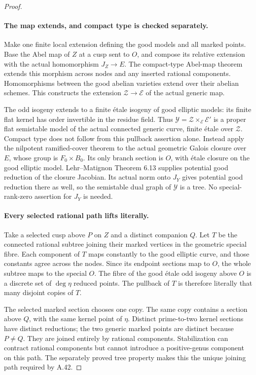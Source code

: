 \begin{proof}
\paragraph{The map extends, and compact type is checked separately.}
Make one finite local extension defining the good models
and all marked points. Base the Abel map of \(Z\) at
a cusp sent to \(O\), and compose its relative extension
with the actual homomorphism \(J_Z\to E\). The
compact-type Abel-map theorem extends this morphism
across nodes and any inserted rational components.
\cite[Theorem 1.1 and Proposition 3.2]{fghDupuyRabinoff}
Homomorphisms between the good abelian varieties extend
over their abelian schemes. This constructs the extension
\(\mathcal Z\to\mathcal E\) of the actual generic map.

The odd isogeny extends to a finite \'{e}tale isogeny
of good elliptic models: its finite flat kernel has order
invertible in the residue field. Thus
\(\mathcal Y=\mathcal Z\times_{\mathcal E}\mathcal E'\)
is a proper flat semistable model of the actual connected
generic curve, finite \'{e}tale over \(\mathcal Z\).
Compact type does not follow from this pullback assertion
alone. Instead apply the nilpotent ramified-cover theorem
to the actual geometric Galois closure over \(E\),
whose group is \(F_0\times B_0\). Its only branch
section is \(O\), with \'{e}tale closure on the good
elliptic model. Lehr--Matignon Theorem 6.13 supplies
potential good reduction of the closure Jacobian.
\cite[Theorem 6.13]{fghLehrMatignon2005}
Its actual norm onto \(J_Y\) gives potential good
reduction there as well, so the semistable dual graph
of \(\mathcal Y\) is a tree. No special-rank-zero
assertion for \(J_Y\) is needed.

\paragraph{Every selected rational path lifts literally.}
Take a selected cusp above \(P\) on \(Z\) and a
distinct companion \(Q\). Let \(T\) be the connected
rational subtree joining their marked vertices in the
geometric special fibre. Each component of \(T\) maps
constantly to the good elliptic curve, and those constants
agree across the nodes. Since its endpoint sections map
to \(O\), the whole subtree maps to the special \(O\).
The fibre of the good \'{e}tale odd isogeny above \(O\)
is a discrete set of \(\deg\eta\) reduced points.
The pullback of \(T\) is therefore literally that many
disjoint copies of \(T\).

The selected marked section chooses one copy. The same
copy contains a section above \(Q\), with the same
kernel point of \(\eta\). Distinct prime-to-two kernel
sections have distinct reductions; the two generic marked
points are distinct because \(P\ne Q\). They are
joined entirely by rational components. Stabilization
can contract rational components but cannot introduce a
positive-genus component on this path. The separately
proved tree property makes this the unique joining path
required by A.42.


\end{proof}
